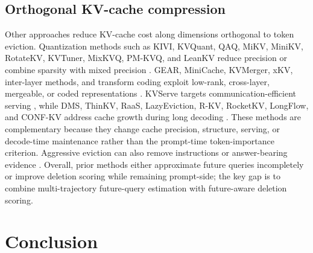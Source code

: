 \documentclass{article} %
\begin{document}
\subsection{Orthogonal KV-cache compression} \label{subsec:rw_orthogonal}
Other approaches reduce KV-cache cost along dimensions orthogonal to token eviction. Quantization methods such as KIVI, KVQuant, QAQ, MiKV, MiniKV, RotateKV, KVTuner, MixKVQ, PM-KVQ, and LeanKV reduce precision or combine sparsity with mixed precision \citep{liu2024kivi,hooper2024kvquant,dong2024qaq,yang2024notokenleft,sharma2024minikv,su2025rotatekv,li2025kvtuner,zhang2025mixkvq,liu2025pmkvq,10.1145/3731569.3764810}. GEAR, MiniCache, KVMerger, xKV, inter-layer methods, and transform coding exploit low-rank, cross-layer, mergeable, or coded representations \citep{kang2024gear,liu2024minicache,wang2024kvmerger,chang2025xkv,ma2024interlayer,staniszewski2026kv}. KVServe targets communication-efficient serving \citep{liu2026kvserve}, while DMS, ThinKV, RaaS, LazyEviction, R-KV, RocketKV, LongFlow, and CONF-KV address cache growth during long decoding \citep{lancucki2025hyperscaling,ramachandran2025thinkv,hu2025raas,zhang2025lazyevict,cai2025rkv,behnam2025rocketkv,su2026longflow,li2026confkv}. These methods are complementary because they change cache precision, structure, serving, or decode-time maintenance rather than the prompt-time token-importance criterion. Aggressive eviction can also remove instructions or answer-bearing evidence \citep{yang2024notokenleft,chen2025pitfalls,garcia2026protection}. Overall, prior methods either approximate future queries incompletely or improve deletion scoring while remaining prompt-side; the key gap is to combine multi-trajectory future-query estimation with future-aware deletion scoring.

\section{Conclusion} \label{sec:conclusion}
\end{document}
